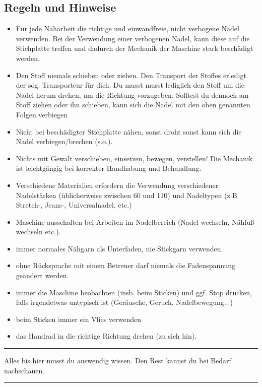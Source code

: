 \documentclass{\basedir/fablab-document}
\begin{document}
\subsection{Regeln und Hinweise}
\begin{itemize}
	\item Für jede Näharbeit die richtige und einwandfreie, nicht verbogene Nadel verwenden. Bei der Verwendung einer verbogenen Nadel, kann diese auf die Stichplatte treffen und dadurch der Mechanik der Maschine stark beschädigt werden.
	\item Den Stoff niemals schieben oder ziehen. Den Transport der Stoffes erledigt der sog. Transporteur für dich. Du musst musst lediglich den Stoff um die Nadel herum drehen, um die Richtung vorzugeben. Solltest du dennoch am Stoff ziehen oder ihn schieben, kann sich die Nadel mit den oben genannten Folgen verbiegen
	\item Nicht bei beschädigter Stichplatte nähen, sonst droht sonst kann sich die Nadel verbiegen/brechen (s.o.).
	\item Nichts mit Gewalt verschieben, einsetzen, bewegen, verstellen! Die Mechanik ist leichtgängig bei korrekter Handhabung und Behandlung.
	
	\item Verschiedene Materialien erfordern die Verwendung verschiedener Nadelstärken (üblicherweise zwischen 60 und 110) und Nadeltypen (z.B. Stretch-, Jeans-,  Universalnadel, etc.)
	
	\item Maschine ausschalten bei Arbeiten im Nadelbereich (Nadel wechseln, Nähfuß wechseln etc.).
	\item immer normales Nähgarn als Unterfaden, nie Stickgarn verwenden.
	\item ohne Rücksprache mit einem Betreuer darf niemals die Fadenspannung geändert werden.
	\item immer die Maschine beobachten (insb. beim Sticken) und ggf. Stop drücken, falls irgendetwas untypisch ist (Geräusche, Geruch, Nadelbewegung...)
	\item beim Sticken immer ein Vlies verwenden
 \item das Handrad in die richtige Richtung drehen (zu sich hin).
\end{itemize}

\vspace{5em}
\hrule

Alles bis hier musst du auswendig wissen. Den Rest kannst du bei Bedarf nachschauen.
\vspace{0.2em}
\hrule
\vspace{3em}
\end{document}
